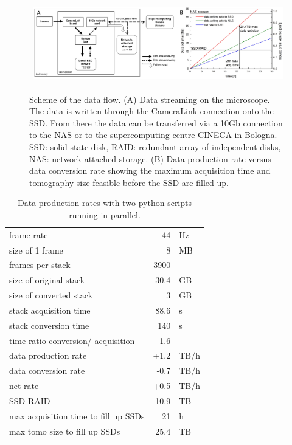 \documentclass[12pt]{spieman}  %
\begin{document}
	\begin{figure}
   \begin{center}
   \begin{tabular}{c}
   \includegraphics[width=\textwidth]{DataFlow.eps}
   \end{tabular}
   \end{center}
   \caption{\label{fig:DataFlow} Scheme of the data flow. (A) Data streaming on the microscope. The data is written through the CameraLink connection onto the SSD. From there the data can be transferred via a 10Gb connection to the NAS or to the supercomputing centre CINECA in Bologna. SSD: solid-state disk, RAID: redundant array of independent disks, NAS: network-attached storage. (B) Data production rate versus data conversion rate showing the maximum acquisition time and tomography size feasible before the SSD are filled up.} 
   \end{figure}
	
\begin{table}%
	\centering
		\caption[Data production]{Data production rates with two python scripts running in parallel.\label{tab:dataproduction}}
		\begin{tabular}{lrl}
		frame rate																	& 44			& Hz	\\
		size of 1 frame															& 8				& MB	\\
		frames per stack														& 3900		& 		\\
		size of original stack											& 30.4		& GB	\\
		size of converted stack											& 3				& GB	\\
		stack acquisition time											& 88.6		& s		\\
		stack conversion time												& 140			& s		\\
		time ratio conversion/ acquisition					& 1.6			& 		\\
		data production rate												& +1.2		&	TB/h\\
		data conversion rate												& -0.7		&	TB/h\\
		net rate																		& +0.5		&	TB/h\\
		SSD RAID																		& 10.9		& TB	\\
		max acquisition time to fill up SSDs				& 21			& h		\\
		max tomo size to fill up SSDs								& 25.4		& TB	\\
		\end{tabular}
\end{table}
\end{document}

